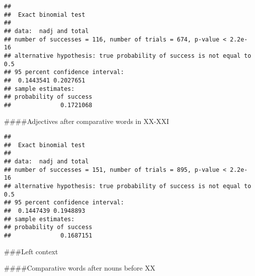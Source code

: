 \documentclass[
]{article}
\newenvironment{Shaded}{\begin{snugshade}}{\end{snugshade}}
\newcommand{\DecValTok}[1]{\textcolor[rgb]{0.00,0.00,0.81}{#1}}
\newcommand{\KeywordTok}[1]{\textcolor[rgb]{0.13,0.29,0.53}{\textbf{#1}}}
\newcommand{\NormalTok}[1]{#1}
\newcommand{\OperatorTok}[1]{\textcolor[rgb]{0.81,0.36,0.00}{\textbf{#1}}}
\newcommand{\StringTok}[1]{\textcolor[rgb]{0.31,0.60,0.02}{#1}}
\begin{document}
\begin{verbatim}
## 
##  Exact binomial test
## 
## data:  nadj and total
## number of successes = 116, number of trials = 674, p-value < 2.2e-16
## alternative hypothesis: true probability of success is not equal to 0.5
## 95 percent confidence interval:
##  0.1443541 0.2027651
## sample estimates:
## probability of success 
##              0.1721068
\end{verbatim}

\#\#\#\#Adjectives after comparative words in XX-XXI

\begin{Shaded}
\end{Shaded}

\begin{verbatim}
## 
##  Exact binomial test
## 
## data:  nadj and total
## number of successes = 151, number of trials = 895, p-value < 2.2e-16
## alternative hypothesis: true probability of success is not equal to 0.5
## 95 percent confidence interval:
##  0.1447439 0.1948893
## sample estimates:
## probability of success 
##              0.1687151
\end{verbatim}

\#\#\#Left context

\#\#\#\#Comparative words after nouns before XX

\begin{Shaded}
\end{Shaded}
\end{document}
